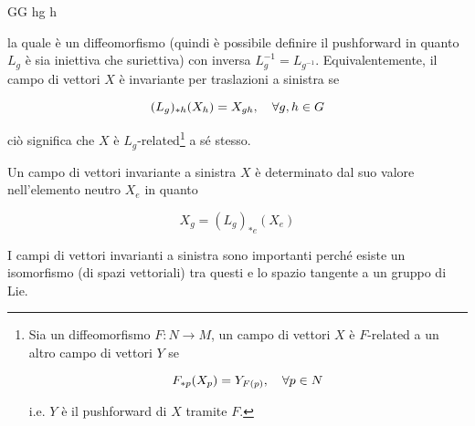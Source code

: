 	{G}{G}
	{h}{g h}

la quale è un diffeomorfismo (quindi è possibile definire il pushforward in quanto $ L_{g} $ è sia iniettiva che suriettiva) con inversa $ L_{g}^{-1} = L_{g^{-1}} $. Equivalentemente, il campo di vettori $ X $ è invariante per traslazioni a sinistra se

\begin{equation}
	(L_{g})_{*h} (X_{h}) = X_{gh} \qcomma \forall g,h \in G
\end{equation}

ciò significa che $ X $ è $ L_{g} $-related\footnote{%
	Sia un diffeomorfismo $ F : N \to M $, un campo di vettori $ X $ è $ F $-related a un altro campo di vettori $ Y $ se
	
	\begin{equation*}
		F_{*p}(X_{p}) = Y_{F(p)} \qcomma \forall p \in N
	\end{equation*}

	i.e. $ Y $ è il pushforward di $ X $ tramite $ F $.%
} a sé stesso.

\begin{remark}
	Un campo di vettori invariante a sinistra $ X $ è determinato dal suo valore nell'elemento neutro $ X_{e} $ in quanto
	
	\begin{equation}
		X_{g} = (L_{g})_{*e} (X_{e})
	\end{equation}
\end{remark}

I campi di vettori invarianti a sinistra sono importanti perché esiste un isomorfismo (di spazi vettoriali) tra questi e lo spazio tangente a un gruppo di Lie.

